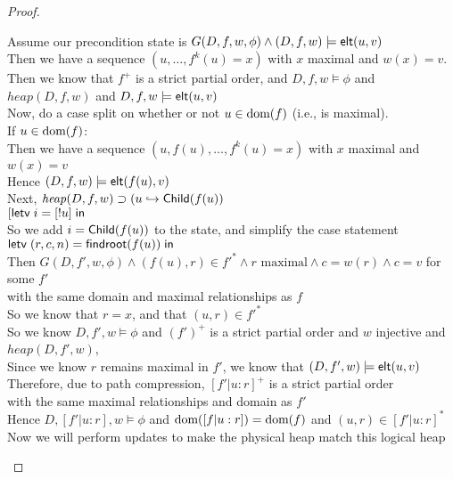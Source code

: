 \begin{proof}
\begin{tabbedproof}
\oo Assume our precondition state is $G(D, f, w, \phi) \land (D,f,w) \models \mathsf{elt}({u}, {v})$ \\
\ooo Then we have a sequence $(u, \ldots, f^k(u) = x)$ with $x$ maximal and $w(x) = v$. \\
\ooo Then we know that $f^+$ is a strict partial order, and $D,f,w \models \phi$ and \\
\oox $\mathit{heap}(D,f,w)$ and $D,f,w \models \mathsf{elt}({u}, {v})$ \\
\ooo Now, do a case split on whether or not $u \in \mbox{dom}({f})$ (i.e., is maximal). \\
\ooo If $u \in \mbox{dom}({f})$: \\
\oooo Then we have a sequence $(u, f(u), \ldots, f^k(u) = x)$ with $x$ maximal and $w(x) = v$ \\
\oooo Hence $(D, f, w) \models \mathsf{elt}({f(u)}, {v})$ \\ 
\oooo Next, $\mathit{heap}(D,f,w) \supset (u \hookrightarrow \mathsf{Child}(f(u))$ \\
\oooo $[\mathsf{letv}\;i = [!u]\;\mathsf{in}\;$ \\
\oooo So we add $i = \mathsf{Child}(f(u))$ to the state, and simplify the case statement \\
\oooo $\mathsf{letv}\;(r,c,n) = \mathsf{findroot}(f(u))\;\mathsf{in}\;$ \\
\oooo Then $G(D, f', w, \phi) \land (f(u), r) \in f'^* \land r\mbox{ maximal} \land c = w(r) \land c = v$ for some $f'$ \\
\oooo with the same domain and maximal relationships as $f$\\
\oooo So we know that $r = x$, and that $(u, r) \in f'^*$ \\ 
\oooo So we know $D, f', w \models \phi$ and $(f')^+$ is a strict partial order and $w$ injective and $\mathit{heap}(D, f', w)$, \\
\oooo Since we know $r$ remains maximal in $f'$, we know that $(D, f', w) \models \mathsf{elt}({u}, {v})$ \\ 
\oooo Therefore, due to path compression, $[f'|u:r]^+$ is a strict partial order \\
\oooox with the same maximal relationships and domain as $f'$\\
\oooo Hence $D, [f'|u:r], w \models \phi$ and $\mbox{dom}({[f|u:r]}) = \mbox{dom}({f})$ and $(u, r) \in [f'|u:r]^*$ \\
\oooo Now we will perform updates to make the physical heap match this logical heap \\ 

\end{tabbedproof}
\end{proof}
